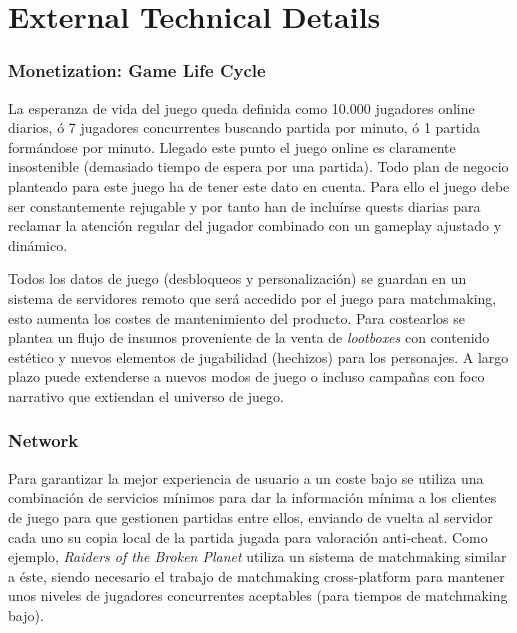 \documentclass[12pt]{report}
\newcommand*\cleartoleftpage{%
  \clearpage
  \ifodd\value{page}\hbox{}\newpage\fi
}
\begin{document}
\cleartoleftpage

\part{External Technical Details}

\section{Monetization: Game Life Cycle}

La esperanza de vida del juego queda definida como 10.000 jugadores online diarios, ó 7 jugadores concurrentes buscando partida por minuto, ó 1 partida formándose por minuto. Llegado este punto el juego online es claramente insostenible (demasiado tiempo de espera por una partida). Todo plan de negocio planteado para este juego ha de tener este dato en cuenta. Para ello el juego debe ser constantemente rejugable y por tanto han de incluírse quests diarias para reclamar la atención regular del jugador combinado con un gameplay ajustado y dinámico.

Todos los datos de juego (desbloqueos y personalización) se guardan en un sistema de servidores remoto que será accedido por el juego para matchmaking, esto aumenta los costes de mantenimiento del producto. Para costearlos se plantea un flujo de insumos proveniente de la venta de \textit{lootboxes} con contenido estético y nuevos elementos de jugabilidad (hechizos) para los personajes. A largo plazo puede extenderse a nuevos modos de juego o incluso campañas con foco narrativo que extiendan el universo de juego.

\section{Network}

Para garantizar la mejor experiencia de usuario a un coste bajo se utiliza una combinación de servicios mínimos para dar la información mínima a los clientes de juego para que gestionen partidas entre ellos, enviando de vuelta al servidor cada uno su copia local de la partida jugada para valoración anti-cheat. Como ejemplo, \textit{Raiders of the Broken Planet} utiliza un sistema de matchmaking similar a éste, siendo necesario el trabajo de matchmaking cross-platform para mantener unos niveles de jugadores concurrentes aceptables (para tiempos de matchmaking bajo).
\end{document}
